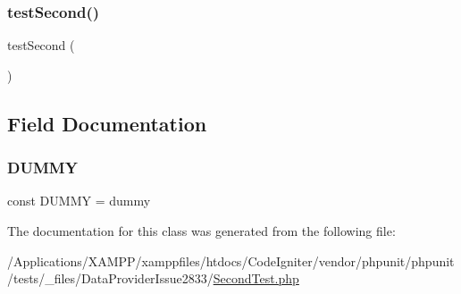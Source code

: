 \subsubsection{\texorpdfstring{test\+Second()}{testSecond()}}
{\footnotesize\ttfamily test\+Second (\begin{DoxyParamCaption}{ }\end{DoxyParamCaption})}



\subsection{Field Documentation}
\mbox{\label{class_foo_1_1_data_provider_issue2833_1_1_second_test_a9eee302e4045c79e9b8ccc51a73851c6}} 
\subsubsection{\texorpdfstring{D\+U\+M\+MY}{DUMMY}}
{\footnotesize\ttfamily const D\+U\+M\+MY = \textquotesingle{}dummy\textquotesingle{}}



The documentation for this class was generated from the following file\+:\begin{DoxyCompactItemize}
\item 
/\+Applications/\+X\+A\+M\+P\+P/xamppfiles/htdocs/\+Code\+Igniter/vendor/phpunit/phpunit/tests/\+\_\+files/\+Data\+Provider\+Issue2833/\mbox{\hyperlink{_data_provider_issue2833_2_second_test_8php}{Second\+Test.\+php}}\end{DoxyCompactItemize}
